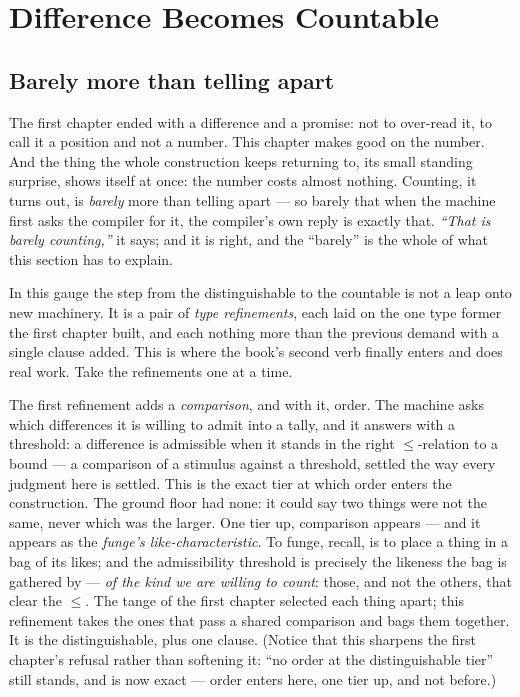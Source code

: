 \chapter{Difference Becomes Countable}

\section{Barely more than telling apart}

The first chapter ended with a difference and a promise: not to over-read it, to call it a position and not a number.
This chapter makes good on the number. And the thing the whole construction keeps returning to, its small standing
surprise, shows itself at once: the number costs almost nothing. Counting, it turns out, is \emph{barely} more than
telling apart --- so barely that when the machine first asks the compiler for it, the compiler's own reply is exactly
that. \emph{``That is barely counting,''} it says; and it is right, and the ``barely'' is the whole of what this
section has to explain.

In this gauge the step from the distinguishable to the countable is not a leap onto new machinery. It is a pair of
\emph{type refinements}, each laid on the one type former the first chapter built, and each nothing more than the
previous demand with a single clause added. This is where the book's second verb finally enters and does real work.
Take the refinements one at a time.

The first refinement adds a \emph{comparison}, and with it, order. The machine asks which differences it is willing to
admit into a tally, and it answers with a threshold: a difference is admissible when it stands in the right
\(\le\)-relation to a bound --- a comparison of a stimulus against a threshold, settled the way every judgment here is
settled. This is the exact tier at which order enters the construction. The ground floor had none: it could say two
things were not the same, never which was the larger. One tier up, comparison appears --- and it appears as the
\emph{funge's like-characteristic}. To funge, recall, is to place a thing in a bag of its likes; and the admissibility
threshold is precisely the likeness the bag is gathered by --- \emph{of the kind we are willing to count}: those, and
not the others, that clear the \(\le\). The tange of the first chapter selected each thing apart; this refinement
takes the ones that pass a shared comparison and bags them together. It is the distinguishable, plus one clause.
(Notice that this sharpens the first chapter's refusal rather than softening it: ``no order at the distinguishable
tier'' still stands, and is now exact --- order enters here, one tier up, and not before.)

